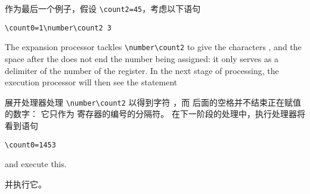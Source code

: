 作为最后一个例子，假设 \verb>\count2=45>，考虑以下语句
\begin{verbatim}
\count0=1\number\count2 3
\end{verbatim}
The expansion processor tackles \verb>\number\count2>
to give the characters , and the space after
the  does not end the number being assigned:
it only serves as a delimiter
of the number of the  register.
In the next stage of processing, the execution processor
will then see the statement

展开处理器处理 \verb>\number\count2> 以得到字符 ，而  后面的空格并不结束正在赋值的数字：
它只作为  寄存器的编号的分隔符。
在下一阶段的处理中，执行处理器将看到语句
\begin{verbatim}
\count0=1453
\end{verbatim}
and execute this.

并执行它。